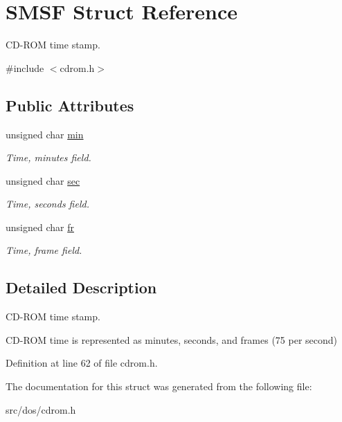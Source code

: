 \hypertarget{structSMSF}{\section{S\-M\-S\-F Struct Reference}
\label{structSMSF}
}


C\-D-\/\-R\-O\-M time stamp.  




{\ttfamily \#include $<$cdrom.\-h$>$}

\subsection*{Public Attributes}
\begin{DoxyCompactItemize}
\item 
\hypertarget{structSMSF_a255d0543dd1a6ed1ef98d1554a305b1c}{unsigned char \hyperlink{structSMSF_a255d0543dd1a6ed1ef98d1554a305b1c}{min}}\label{structSMSF_a255d0543dd1a6ed1ef98d1554a305b1c}

\begin{DoxyCompactList}\small\item\em Time, minutes field. \end{DoxyCompactList}\item 
\hypertarget{structSMSF_a03726b294328a234ca219fdcdcf59b41}{unsigned char \hyperlink{structSMSF_a03726b294328a234ca219fdcdcf59b41}{sec}}\label{structSMSF_a03726b294328a234ca219fdcdcf59b41}

\begin{DoxyCompactList}\small\item\em Time, seconds field. \end{DoxyCompactList}\item 
\hypertarget{structSMSF_a7e7a172427d5827e25ed35c3f62a2ce5}{unsigned char \hyperlink{structSMSF_a7e7a172427d5827e25ed35c3f62a2ce5}{fr}}\label{structSMSF_a7e7a172427d5827e25ed35c3f62a2ce5}

\begin{DoxyCompactList}\small\item\em Time, frame field. \end{DoxyCompactList}\end{DoxyCompactItemize}


\subsection{Detailed Description}
C\-D-\/\-R\-O\-M time stamp. 

C\-D-\/\-R\-O\-M time is represented as minutes, seconds, and frames (75 per second) 

Definition at line 62 of file cdrom.\-h.



The documentation for this struct was generated from the following file\-:\begin{DoxyCompactItemize}
\item 
src/dos/cdrom.\-h\end{DoxyCompactItemize}
